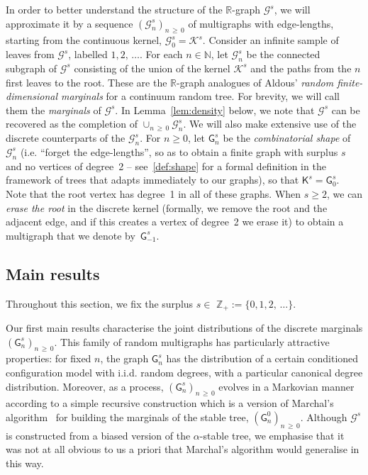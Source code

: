 \documentclass[10pt]{amsart}
\theoremstyle{definition}\newtheorem{defi}[theo]{Definition}\newtheorem{rema}[theo]{Remark}\newtheorem{exam}[theo]{Example}\newtheorem{exem}[theo]{Example}\newtheorem{nota}[theo]{Notation}
\newcommand{\cG}{\mathcal{G}}
\newcommand{\cK}{\mathcal{K}}
\newcommand{\sG}{\mathsf{G}}
\newcommand{\sK}{\mathsf{K}}
\newcommand{\R}{\mathbb{R}}
\newcommand{\Z}{\mathbb{Z}}
\newcommand{\N}{\mathbb{N}}
\begin{document}
In order to better understand the structure of the $\R$-graph $\cG^s$, we will approximate it by a sequence $(\cG^s_n)_{n\,\ge\,0}$ of multigraphs with edge-lengths, starting from the continuous kernel, $\cG_{0}^s=\cK^s$. Consider an infinite sample of leaves from $\cG^s$, labelled $1,2,\,\ldots$. For each $n \in \N$, let $\cG_{n}^s$ be the connected subgraph of $\cG^s$ consisting of the union of the kernel $\cK^s$ and the paths from the $n$ first leaves to the root. These are the $\R$-graph analogues of Aldous' \emph{random finite-dimensional marginals} for a continuum random tree. For brevity, we will call them the \emph{marginals} of $\cG^s$. In Lemma~\ref{lem:density} below, we note that $\cG^s$ can be recovered as the completion of $\cup_{n\,\geq\,0} \cG_{n}^s$. We will also make extensive use of the discrete counterparts of the $\cG_n^s$. For $n\geq 0$, let $\sG_{n}^s$ be the \emph{combinatorial shape} of $\cG_{n}^s$ (i.e. ``forget the edge-lengths'', so as to obtain a finite graph with surplus $s$ and no vertices of degree~2 -- see~\eqref{def:shape} for a formal definition in the framework of trees that adapts immediately to our graphs), so that $\sK^s=\sG_{0}^s$. Note that the root vertex has degree~1 in all of these graphs. When $s\geq 2$, we can \emph{erase the root} in the discrete kernel (formally, we remove the root and the adjacent edge, and if this creates a vertex of degree~2 we erase it) to obtain a multigraph that we denote by~$\sG_{-1}^{s}$.


\subsection{Main results}\label{sec:mainresults}

Throughout this section, we fix the surplus $s \in$ $\Z_+ := \{0,1,2,\,\ldots\}$.

Our first main results characterise the joint distributions of the discrete marginals $(\sG_n^s)_{n \,\ge\,0}$. This family of random multigraphs has particularly attractive properties: for fixed $n$, the graph $\sG_n^s$ has the distribution of a certain conditioned configuration model with i.i.d. random degrees, with a particular canonical degree distribution. Moreover, as a process, $(\sG_n^s)_{n \,\ge\,0}$ evolves in a Markovian manner according to a simple recursive construction which is a version of Marchal's algorithm~\cite{Marchal} for building the marginals of the stable tree, $(\sG_n^0)_{n\,\ge\,0}$. Although $\cG^s$ is constructed from a biased version of the $\alpha$-stable tree, we emphasise that it was not at all obvious to us a priori that Marchal's algorithm would generalise in this way.
\end{document}
